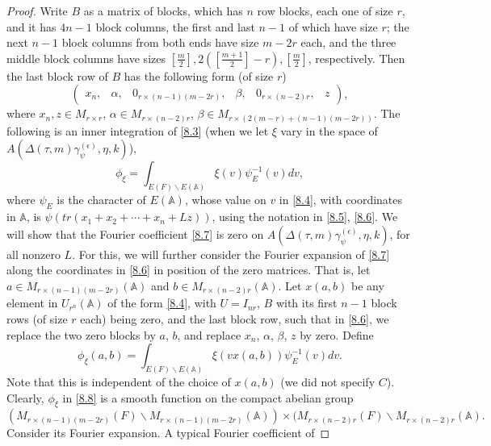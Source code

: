 \documentclass[12pts]{amsart}
\newcommand{\BA}{{\mathbb {A}}}
\begin{document}
\begin{proof}
	Write $B$ as a matrix of blocks, which has $n$ row blocks, each one
	of size $r$, and it has $4n-1$ block columns, the first and last
	$n-1$ of which have size $r$; the next $n-1$ block columns from both ends have size $m-2r$ each, and the three middle block
	columns have sizes $[\frac{m}{2}], 2([\frac{m+1}{2}]-r), [\frac{m}{2}]$, respectively. Then the last
	block row of $B$ has the following form (of size $r$)
	\begin{equation}\label{8.6}
	\begin{pmatrix}x_n,&\alpha,&0_{r\times (n-1)(m-2r)},&\beta,&0_{r\times (n-2)r},&z\end{pmatrix},
	\end{equation}
	where $x_n,z\in M_{r\times r}$, $\alpha\in M_{r\times (n-2)r}$, $\beta\in M_{r\times (2(m-r)+(n-1)(m-2r))}$. The
	following is an inner integration of \eqref{8.3} (when we let $\xi$ vary in the space of\\
	 $A(\Delta(\tau,m)\gamma_\psi^{(\epsilon)},\eta,k)$),
	\begin{equation}\label{8.7}
	\phi_\xi=\int_{E(F)\backslash E(\BA)}\xi(v)\psi_E^{-1}(v)dv,
	\end{equation}
	where $\psi_E$ is the character of $E(\BA)$, whose value on $v$ in
	\eqref{8.4}, with coordinates in $\BA$, is
	$\psi(tr(x_1+x_2+\cdots+x_n+Lz))$, using the notation in
	\eqref{8.5}, \eqref{8.6}. We will show that the Fourier coefficient
	\eqref{8.7} is zero on $A(\Delta(\tau,m)\gamma_\psi^{(\epsilon)},\eta,k)$, for all nonzero $L$. For this,
	we will further consider the Fourier expansion of \eqref{8.7} along
	the coordinates in \eqref{8.6} in position of the zero matrices.
	That is, let $a\in M_{r\times (n-1)(m-2r)}(\BA)$ and $b\in M_{r\times
		(n-2)r}(\BA)$. Let $x(a,b)$ be any element in $U_{r^n}(\BA)$
	of the form \eqref{8.4}, with $U=I_{nr}$, $B$ with its first $n-1$
	block rows (of size $r$ each) being zero, and the last block row,
	such that in \eqref{8.6}, we replace the two zero blocks by $a$,
	$b$, and replace $x_n$, $\alpha$, $\beta$, $z$ by zero. Define
	\begin{equation}\label{8.8}
	\phi_\xi(a,b)=\int_{E(F)\backslash E(\BA)}\xi(vx(a,b))\psi_E^{-1}(v)dv.
	\end{equation}
	Note that this is independent of the choice of $x(a,b)$ (we did not
	specify $C$). Clearly, $\phi_\xi$ in \eqref{8.8} is a smooth
	function on the compact abelian group
	$$
	(M_{r\times (n-1)(m-2r)}(F)\backslash M_{r\times (n-1)(m-2r)}(\BA))\times (
	M_{r\times (n-2)r}(F)\backslash M_{r\times (n-2)r}(\BA).
	$$
	Consider its Fourier expansion. A typical Fourier coefficient of

\end{proof}
\end{document}
